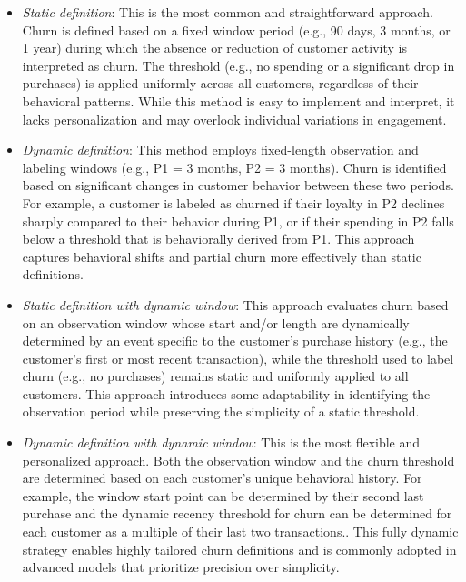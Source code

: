 \documentclass[preprint,12pt]{elsarticle}
\begin{document}
\begin{itemize}
    \item \textit{Static definition}: This is the most common and straightforward approach. Churn is defined based on a fixed window period (e.g., 90 days, 3 months, or 1 year) during which the absence or reduction of customer activity is interpreted as churn. The threshold (e.g., no spending or a significant drop in purchases) is applied uniformly across all customers, regardless of their behavioral patterns. While this method is easy to implement and interpret, it lacks personalization and may overlook individual variations in engagement.
    
    \item \textit{Dynamic definition}: This method employs fixed-length observation and labeling windows (e.g., P1 = 3 months, P2 = 3 months). Churn is identified based on significant changes in customer behavior between these two periods. For example, a customer is labeled as churned if their loyalty in P2 declines sharply compared to their behavior during P1, or if their spending in P2 falls below a threshold that is behaviorally derived from P1. This approach captures behavioral shifts and partial churn more effectively than static definitions.
    
    \item \textit{Static definition with dynamic window}: 
    This approach evaluates churn based on an observation window whose start and/or length are dynamically determined by an event specific to the customer's purchase history (e.g., the customer's first or most recent transaction), while the threshold used to label churn (e.g., no purchases) remains static and uniformly applied to all customers.
    This approach introduces some adaptability in identifying the observation period while preserving the simplicity of a static threshold.
    
    \item \textit{Dynamic definition with dynamic window}: This is the most flexible and personalized approach. Both the observation window and the churn threshold are determined based on each customer’s unique behavioral history. For example, the window start point can be determined by their second last purchase and the dynamic recency threshold for churn can be determined for each customer as a multiple of their last two transactions.. This fully dynamic strategy enables highly tailored churn definitions and is commonly adopted in advanced models that prioritize precision over simplicity.


\end{itemize}
\end{document}
